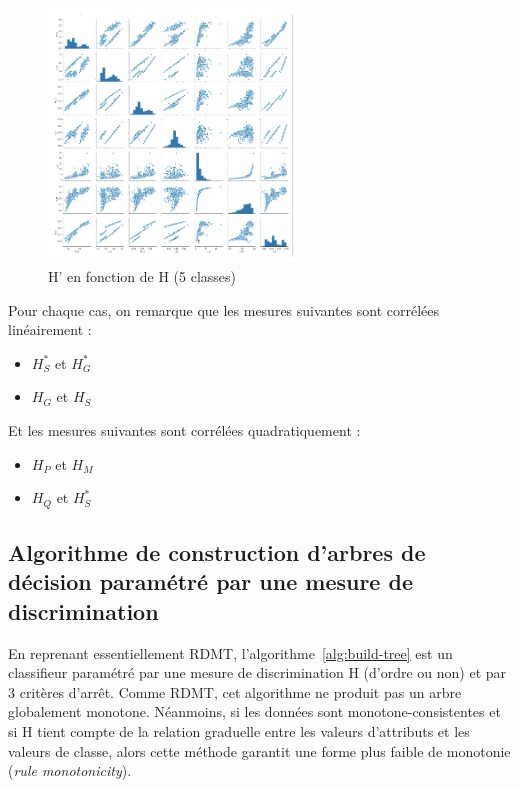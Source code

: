 \documentclass[a4paper]{article}
\begin{document}
\begin{figure}[H]

	\center 
	\includegraphics[width=0.6\textwidth]{images/H_5.png}
    \caption{H' en fonction de H (5 classes)}
    \label{img:H_5}
\end{figure}

Pour chaque cas, on remarque que les mesures suivantes sont corrélées
linéairement :
\begin{itemize}
    \item $H^*_S$ et $H^*_G$
    \item $H_G$ et $H_S$
\end{itemize}

Et les mesures suivantes sont corrélées quadratiquement :
\begin{itemize}
    \item $H_P$ et $H_M$
    \item $H_Q$ et $H^*_S$
\end{itemize}

\subsection{Algorithme de construction d'arbres de décision paramétré par une
mesure de discrimination}


En reprenant essentiellement RDMT, l'algorithme~\ref{alg:build-tree} est un
classifieur paramétré par une mesure de discrimination H (d'ordre ou non) et par
3 critères d'arrêt. Comme RDMT, cet algorithme ne produit pas un arbre
globalement monotone. Néanmoins, si les données sont monotone-consistentes et si
H tient compte de la relation graduelle entre les valeurs d'attributs et les
valeurs de classe, alors cette méthode garantit une forme plus faible de
monotonie (\textit{rule monotonicity}). 
\end{document}
